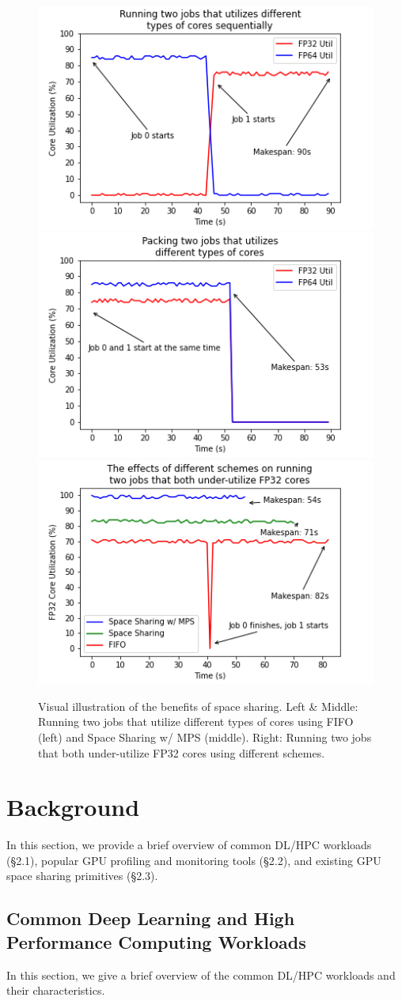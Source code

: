 \documentclass{article}
\begin{document}
\begin{figure}
\label{ss_benefits}
    \includegraphics[width=.33\textwidth]{images/fig1_fifo.png}\hfill
    \includegraphics[width=.33\textwidth]{images/fig1_ss.png}\hfill
    \includegraphics[width=.33\textwidth]{images/fig1a.png}\hfill
    \caption{Visual illustration of the benefits of space sharing. Left \& Middle: Running two jobs that utilize different types of cores using FIFO (left) and Space Sharing w/ MPS (middle). Right: Running two jobs that both under-utilize FP32 cores using different schemes.}
    \label{fig:foobar}
\end{figure}



\section{Background}

In this section, we provide a brief overview of common DL/HPC workloads (§2.1), popular GPU profiling and monitoring tools (§2.2), and existing GPU space sharing primitives (§2.3).

\subsection{Common Deep Learning and High Performance Computing Workloads}

In this section, we give a brief overview of the common DL/HPC workloads and their characteristics.
\end{document}
